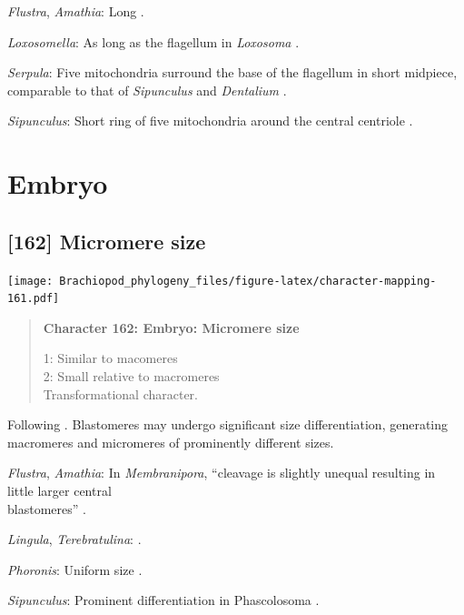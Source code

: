 \documentclass[openany]{book}
\begin{document}
\hypertarget{Amathia-coding-161}{}
\emph{Flustra}, \emph{Amathia}: Long \citep{Franzen1981}.

\hypertarget{Loxosomella-coding-161}{}
\emph{Loxosomella}: As long as the flagellum in \emph{Loxosoma}
\citep{Franzen2000}.

\hypertarget{Serpula-coding-161}{}
\emph{Serpula}: Five mitochondria surround the base of the flagellum in
short midpiece, comparable to that of \emph{Sipunculus} and
\emph{Dentalium} \citep{Gherardi2011}.

\hypertarget{Sipunculus-coding-161}{}
\emph{Sipunculus}: Short ring of five mitochondria around the central
centriole \citep{Rice1993}.

\section{Embryo}\label{embryo}

\subsection*{{[}162{]} Micromere size}\label{micromere-size}

\texttt{[image: Brachiopod\_phylogeny\_files/figure-latex/character-mapping-161.pdf]}

\begin{quote}
\textbf{Character 162: Embryo: Micromere size}

1: Similar to macomeres\\
2: Small relative to macromeres\\
Transformational character.
\end{quote}

Following \citet{Hejnol2010}. Blastomeres may undergo significant size
differentiation, generating macromeres and micromeres of prominently
different sizes.

\hypertarget{Amathia-coding-162}{}
\emph{Flustra}, \emph{Amathia}: In \emph{Membranipora}, ``cleavage is
slightly unequal resulting in little larger central\\
blastomeres'' \citep{Gruhl2010M}.

\hypertarget{Lingula-coding-162}{}
\emph{Lingula}, \emph{Terebratulina}: \citet{Williams1997Introduction}.

\hypertarget{Phoronis-coding-162}{}
\emph{Phoronis}: Uniform size \citep{Pennerstorfer2012}.

\hypertarget{Sipunculus-coding-162}{}
\emph{Sipunculus}: Prominent differentiation in Phascolosoma
\citep{Adrianov2011}.
\end{document}
